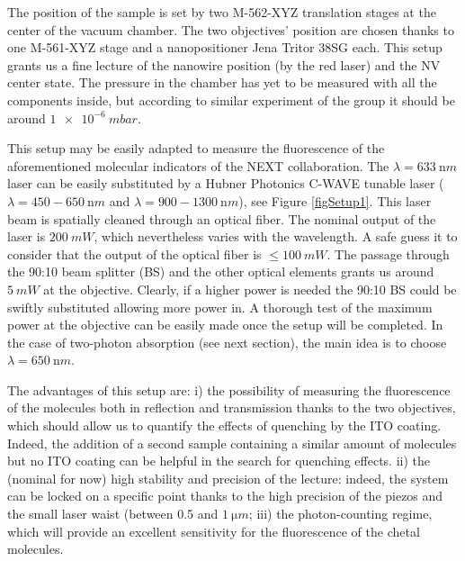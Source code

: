 \documentclass{article}
\begin{document}
The position of the sample is set by two M-562-XYZ translation stages at the center of the vacuum chamber. The two objectives' position are chosen thanks to one M-561-XYZ stage and a nanopositioner Jena Tritor 38SG each. This setup grants us a fine lecture of the nanowire position (by the red laser) and the NV center state. The pressure in the chamber has yet to be measured with all the components inside, but according to similar experiment of the group it should be around $\SI{1e-6}{mbar}$.

This setup may be easily adapted to measure the fluorescence of the aforementioned molecular indicators of the NEXT collaboration. The $\lambda=\SI{633}{\nano m}$ laser can be easily substituted by a Hubner Photonics C-WAVE tunable laser ($\lambda=450-\SI{650}{\nano m}$ and $\lambda=900-\SI{1300}{\nano m}$), see Figure \ref{figSetup1}. This laser beam is spatially cleaned through an optical fiber. The nominal output of the laser is $\SI{200}{mW}$, which nevertheless varies with the wavelength. A safe guess it to consider that the output of the optical fiber is $\leq\SI{100}{mW}$. The passage through the 90:10 beam splitter (BS) and the other optical elements grants us around $\SI{5}{mW}$ at the objective. Clearly, if a higher power is needed the 90:10 BS could be swiftly substituted allowing more power in. A thorough test of the maximum power at the objective can be easily made once the setup will be completed. In the case of two-photon absorption (see next section), the main idea is to choose $\lambda=\SI{650}{\nano m}$.

The advantages of this setup are: i) the possibility of measuring the fluorescence of the molecules both in reflection and transmission thanks to the two objectives, which should allow us to quantify the effects of quenching by the ITO coating. Indeed, the addition of a second sample containing a similar amount of molecules but no ITO coating can be helpful in the search for quenching effects. ii) the (nominal for now) high stability and precision of the lecture: indeed, the system can be locked on a specific point thanks to the high precision of the piezos and the small laser waist (between 0.5 and $\SI{1}{\micro m}$; iii) the photon-counting regime, which will provide an excellent sensitivity for the fluorescence of the chetal molecules.
\end{document}

